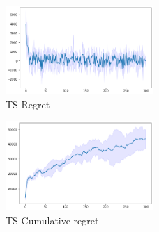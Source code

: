 \begin{multicols}{2}
    \begin{figure}[H]
        \begin{center}
        \includegraphics[width=0.5\textwidth]{img/ts_regret5.png}
        \caption{TS Regret}
        \label{fig:regret52}
        \end{center}
    \end{figure}
    \columnbreak
    \begin{figure}[H]
        \begin{center}
        \includegraphics[width=0.5\textwidth]{img/ts_cum_regret5.png}
        \caption{TS Cumulative regret}
        \label{fig:cum_reg52}
        \end{center}
    \end{figure}
\end{multicols}
